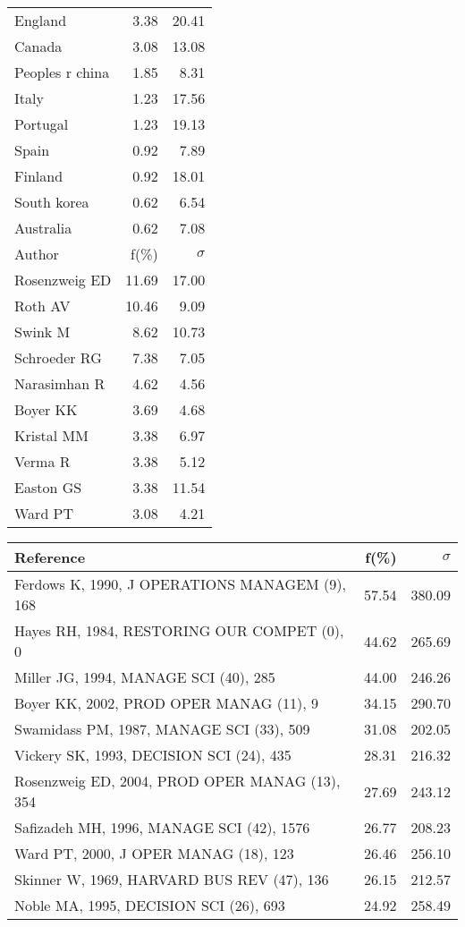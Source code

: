 \documentclass[a4paper,11pt]{report}
\begin{document}
\begin{landscape}
\begin{table}[!ht]
{\begin{tabular}{|l r r|}
England & 3.38 & 20.41\\
Canada & 3.08 & 13.08\\
Peoples r china & 1.85 & 8.31\\
Italy & 1.23 & 17.56\\
Portugal & 1.23 & 19.13\\
Spain & 0.92 & 7.89\\
Finland & 0.92 & 18.01\\
South korea & 0.62 & 6.54\\
Australia & 0.62 & 7.08\\
\hline
\hline
Author & f(\%) & $\sigma$\\
\hline
Rosenzweig ED & 11.69 & 17.00\\
Roth AV & 10.46 & 9.09\\
Swink M & 8.62 & 10.73\\
Schroeder RG & 7.38 & 7.05\\
Narasimhan R & 4.62 & 4.56\\
Boyer KK & 3.69 & 4.68\\
Kristal MM & 3.38 & 6.97\\
Verma R & 3.38 & 5.12\\
Easton GS & 3.38 & 11.54\\
Ward PT & 3.08 & 4.21\\
\hline
\end{tabular}
}
{\scriptsize\begin{tabular}{|l r r|}
\hline
Reference & f(\%) & $\sigma$\\
\hline
Ferdows K, 1990, J OPERATIONS MANAGEM (9), 168 & 57.54 & 380.09\\
Hayes RH, 1984, RESTORING OUR COMPET (0), 0 & 44.62 & 265.69\\
Miller JG, 1994, MANAGE SCI (40), 285 & 44.00 & 246.26\\
Boyer KK, 2002, PROD OPER MANAG (11), 9 & 34.15 & 290.70\\
Swamidass PM, 1987, MANAGE SCI (33), 509 & 31.08 & 202.05\\
Vickery SK, 1993, DECISION SCI (24), 435 & 28.31 & 216.32\\
Rosenzweig ED, 2004, PROD OPER MANAG (13), 354 & 27.69 & 243.12\\
Safizadeh MH, 1996, MANAGE SCI (42), 1576 & 26.77 & 208.23\\
Ward PT, 2000, J OPER MANAG (18), 123 & 26.46 & 256.10\\
Skinner W, 1969, HARVARD BUS REV (47), 136 & 26.15 & 212.57\\
Noble MA, 1995, DECISION SCI (26), 693 & 24.92 & 258.49\\

\end{tabular}}
\end{table}
\end{landscape}
\end{document}
